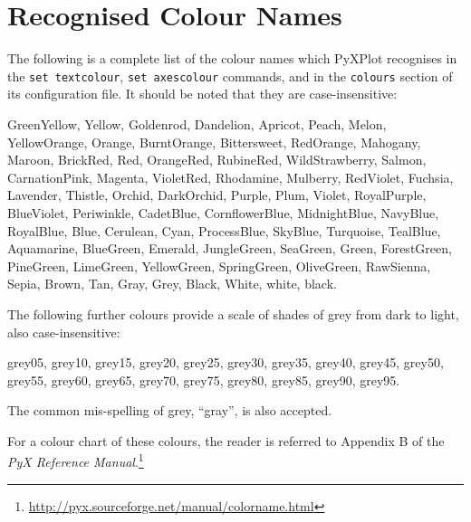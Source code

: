 \section{Recognised Colour Names}
\label{colour_names}

The following is a complete list of the colour names which PyXPlot recognises in the {\tt set textcolour}, {\tt set axescolour} commands, and in the {\tt colours} section of its configuration file. It should be noted that they are case-insensitive:

GreenYellow, Yellow, Goldenrod, Dandelion, Apricot, Peach, Melon, YellowOrange, Orange, BurntOrange, Bittersweet, RedOrange, Mahogany, Maroon, BrickRed, Red, OrangeRed, RubineRed, WildStrawberry, Salmon, CarnationPink, Magenta, VioletRed, Rhodamine, Mulberry, RedViolet, Fuchsia, Lavender, Thistle, Orchid, DarkOrchid, Purple, Plum, Violet, RoyalPurple, BlueViolet, Periwinkle, CadetBlue, CornflowerBlue, MidnightBlue, NavyBlue, RoyalBlue, Blue, Cerulean, Cyan, ProcessBlue, SkyBlue, Turquoise, TealBlue, Aquamarine, BlueGreen, Emerald, JungleGreen, SeaGreen, Green, ForestGreen, PineGreen, LimeGreen, YellowGreen, SpringGreen, OliveGreen, RawSienna, Sepia, Brown, Tan, Gray, Grey, Black, White, white, black.

The following further colours provide a scale of shades of grey from dark to light, also case-insensitive:

grey05, grey10, grey15, grey20, grey25, grey30, grey35, grey40, grey45, grey50, grey55, grey60, grey65, grey70, grey75, grey80, grey85, grey90, grey95.

The common mis-spelling of grey, ``gray'', is also accepted.

For a colour chart of these colours, the reader is referred to Appendix B of the \textit{PyX Reference Manual}.\footnote{\url{http://pyx.sourceforge.net/manual/colorname.html}}
